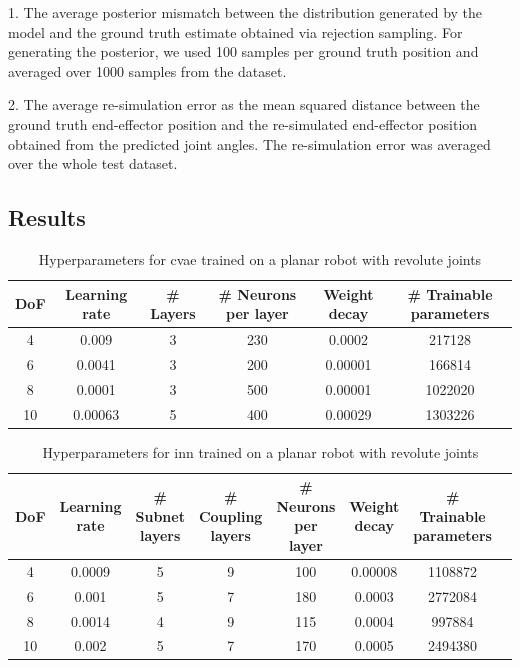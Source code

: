 \documentclass[conference]{IEEEtran}
\begin{document}
1. The average posterior mismatch between the distribution generated by the model and the ground truth estimate obtained via rejection sampling. For generating the posterior, we used 100 samples per ground truth position and averaged over 1000 samples from the dataset.

2. The average re-simulation error as the mean squared distance between the ground truth end-effector position and the re-simulated end-effector position obtained from the predicted joint angles. The re-simulation error was averaged over the whole test dataset.

\subsection*{Results}

\begin{table}[h]
\caption{Hyperparameters for cvae trained on a planar robot with revolute joints}
\label{tab:results:cvae}
\centering
\begin{tabular}{|c|c|c|c|c|c|}
\hline
DoF & Learning rate & \# Layers & \# Neurons per layer & Weight decay & \# Trainable parameters \\
\hline
4  & 0.009 & 3 & 230 & 0.0002 & 217128 \\
6  & 0.0041 & 3 & 200 & 0.00001 & 166814 \\
8  & 0.0001 & 3 & 500 & 0.00001 & 1022020 \\
10  & 0.00063 & 5 & 400 & 0.00029 & 1303226 \\
\hline
\end{tabular}
\end{table}

\begin{table}[h]
\caption{Hyperparameters for inn trained on a planar robot with revolute joints}
\label{tab:results:inn}
\centering
\begin{tabular}{|c|c|c|c|c|c|c|c|}
\hline
DoF & Learning rate & \# Subnet layers & \# Coupling layers & \# Neurons per layer & Weight decay & \# Trainable parameters \\
\hline
4  & 0.0009 & 5 & 9 & 100 & 0.00008 & 1108872 \\
6  & 0.001 & 5 & 7 & 180 & 0.0003 & 2772084 \\
8  & 0.0014 & 4 & 9 & 115 & 0.0004 & 997884 \\
10  & 0.002 & 5 & 7 & 170 & 0.0005 & 2494380 \\
\hline
\end{tabular}
\end{table}
\end{document}
